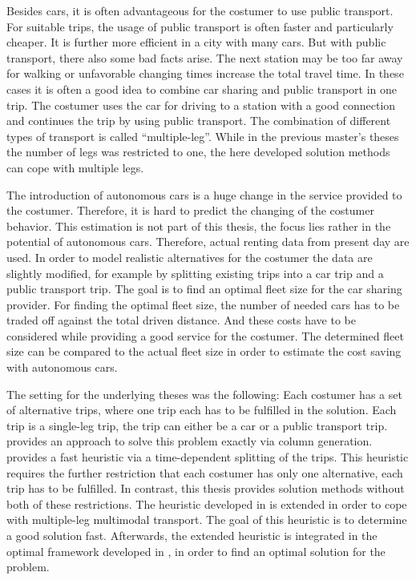 Besides cars, it is often advantageous for the costumer to use public transport. For suitable trips, the usage of public transport is often faster and particularly cheaper. It is further more efficient in a city with many cars. But with public transport, there also some bad facts arise. The next station may be too far away for walking or unfavorable changing times increase the total travel time. In these cases it is often a good idea to combine car sharing and public transport in one trip. The costumer uses the car for driving to a station with a good connection and continues the trip by using public transport. The combination of different types of transport is called ``multiple-leg''. While in the previous master's theses the number of legs was restricted to one, the here developed solution methods can cope with multiple legs.

The introduction of autonomous cars is a huge change in the service provided to the costumer. Therefore, it is hard to predict the changing of the costumer behavior. This estimation is not part of this thesis, the focus lies rather in the potential of autonomous cars. Therefore, actual renting data from present day are used. In order to model realistic alternatives for the costumer the data are slightly modified, for example by splitting existing trips into a car trip and a public transport trip. The goal is to find an optimal fleet size for the car sharing provider. For finding the optimal fleet size, the number of needed cars has to be traded off against the total driven distance. And these costs have to be considered while providing a good service for the costumer. The determined fleet size can be compared to the actual fleet size in order to estimate the cost saving with autonomous cars.

The setting for the underlying theses was the following: Each costumer has a set of alternative trips, where one trip each has to be fulfilled in the solution. Each trip is a single-leg trip, \ie the trip can either be a car or a public transport trip. \cite{Kaiser} provides an approach to solve this problem exactly via column generation. \cite{Knoll} provides a fast heuristic via a time-dependent splitting of the trips. This heuristic requires the further restriction that each costumer has only one alternative, \ie each trip has to be fulfilled. In contrast, this thesis provides solution methods without both of these restrictions. The heuristic developed in \cite{Knoll} is extended in order to cope with multiple-leg multimodal transport. The goal of this heuristic is to determine a good solution fast. Afterwards, the extended heuristic is integrated in the optimal framework developed in \cite{Kaiser}, in order to find an optimal solution for the problem.
